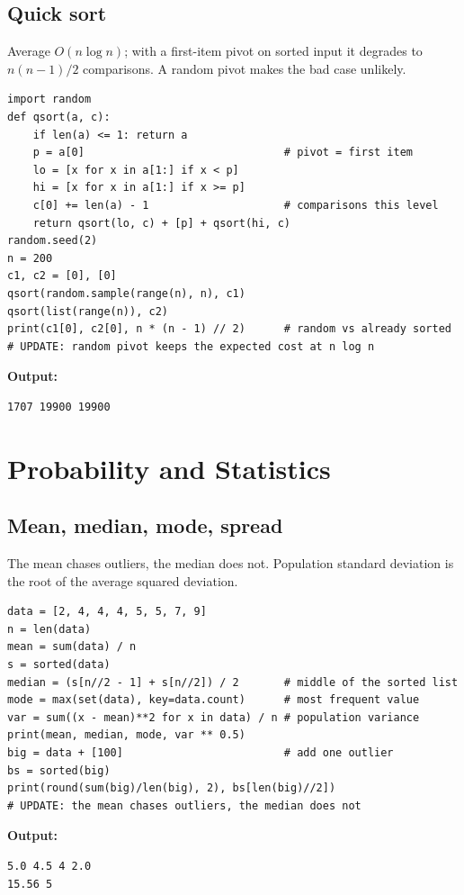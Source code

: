 \documentclass[11pt]{article}
\begin{document}
\subsection*{Quick sort}
Average $O(n\log n)$; with a first-item pivot on sorted input it degrades to $n(n-1)/2$ comparisons. A random pivot makes the bad case unlikely.
\begin{Verbatim}[fontsize=\footnotesize,frame=single]
import random
def qsort(a, c):
    if len(a) <= 1: return a
    p = a[0]                               # pivot = first item
    lo = [x for x in a[1:] if x < p]
    hi = [x for x in a[1:] if x >= p]
    c[0] += len(a) - 1                     # comparisons this level
    return qsort(lo, c) + [p] + qsort(hi, c)
random.seed(2)
n = 200
c1, c2 = [0], [0]
qsort(random.sample(range(n), n), c1)
qsort(list(range(n)), c2)
print(c1[0], c2[0], n * (n - 1) // 2)      # random vs already sorted
# UPDATE: random pivot keeps the expected cost at n log n
\end{Verbatim}
\textbf{Output:}
\begin{Verbatim}[fontsize=\footnotesize,frame=single]
1707 19900 19900
\end{Verbatim}
\section{Probability and Statistics}
\subsection*{Mean, median, mode, spread}
The mean chases outliers, the median does not. Population standard deviation is the root of the average squared deviation.
\begin{Verbatim}[fontsize=\footnotesize,frame=single]
data = [2, 4, 4, 4, 5, 5, 7, 9]
n = len(data)
mean = sum(data) / n
s = sorted(data)
median = (s[n//2 - 1] + s[n//2]) / 2       # middle of the sorted list
mode = max(set(data), key=data.count)      # most frequent value
var = sum((x - mean)**2 for x in data) / n # population variance
print(mean, median, mode, var ** 0.5)
big = data + [100]                         # add one outlier
bs = sorted(big)
print(round(sum(big)/len(big), 2), bs[len(big)//2])
# UPDATE: the mean chases outliers, the median does not
\end{Verbatim}
\textbf{Output:}
\begin{Verbatim}[fontsize=\footnotesize,frame=single]
5.0 4.5 4 2.0
15.56 5
\end{Verbatim}
\end{document}
